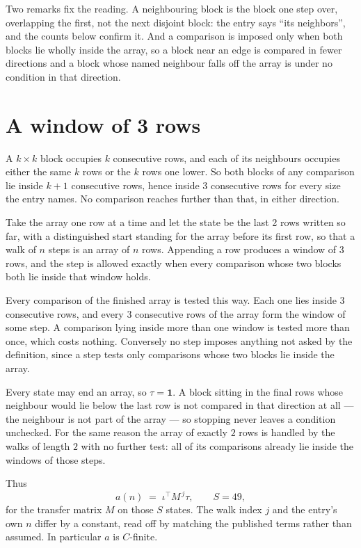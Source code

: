 \documentclass[11pt,a4paper]{article}
\theoremstyle{plain}
\theoremstyle{definition}
\begin{document}
Two remarks fix the reading. A neighbouring block is the block one step over, overlapping the
first, not the next disjoint block: the entry says ``its neighbors'', and the counts below
confirm it. And a comparison is imposed only when both blocks lie wholly inside the array, so a
block near an edge is compared in fewer directions and a block whose named neighbour falls off
the array is under no condition in that direction.

\section{A window of 3 rows}

A $k\times k$ block occupies $k$ consecutive rows, and each of its neighbours occupies either
the same $k$ rows or the $k$ rows one lower. So both blocks of any comparison lie inside $k+1$
consecutive rows, hence inside $3$ consecutive rows for every size the entry names. No
comparison reaches further than that, in either direction.

Take the array one row at a time and let the state be the last 2 rows written so far, with a
distinguished start standing for the array before its first row, so that a walk of $n$ steps is
an array of $n$ rows. Appending a row produces a window of $3$ rows, and the step is
allowed exactly when every comparison whose two blocks both lie inside that window holds.

Every comparison of the finished array is tested this way. Each one lies inside $3$
consecutive rows, and every $3$ consecutive rows of the array form the window of some
step. A comparison lying inside more than one window is tested more than once, which costs
nothing. Conversely no step imposes anything not asked by the definition, since a step tests
only comparisons whose two blocks lie inside the array.

Every state may end an array, so $\tau=\mathbf{1}$. A block sitting in the final rows whose
neighbour would lie below the last row is not compared in that direction at all --- the
neighbour is not part of the array --- so stopping never leaves a condition unchecked. For the
same reason the array of exactly $2$ rows is handled by the walks of length $2$ with no
further test: all of its comparisons already lie inside the windows of those steps.

Thus
\[
a(n)\;=\;\iota^{\!\top}M^{\,j}\tau ,\qquad S=49,
\]
for the transfer matrix $M$ on those $S$ states. The walk index $j$ and the entry's own $n$
differ by a constant, read off by matching the published terms rather than assumed. In
particular $a$ is $C$-finite.
\end{document}

